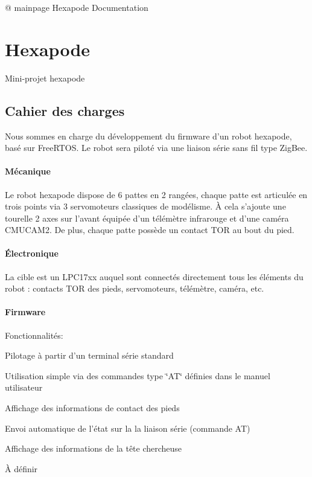 @ mainpage Hexapode Documentation \section*{Hexapode }

Mini-\/projet hexapode

\subsection*{Cahier des charges}

Nous sommes en charge du développement du firmware d'un robot hexapode, basé sur Free\-R\-T\-O\-S. Le robot sera piloté via une liaison série sans fil type Zig\-Bee.

\paragraph*{Mécanique}

Le robot hexapode dispose de 6 pattes en 2 rangées, chaque patte est articulée en trois points via 3 servomoteurs classiques de modélisme. À cela s'ajoute une tourelle 2 axes sur l'avant équipée d'un télémètre infrarouge et d'une caméra C\-M\-U\-C\-A\-M2. De plus, chaque patte possède un contact T\-O\-R au bout du pied.

\paragraph*{Électronique}

La cible est un L\-P\-C17xx auquel sont connectés directement tous les éléments du robot \-: contacts T\-O\-R des pieds, servomoteurs, télémètre, caméra, etc.

\paragraph*{Firmware}

Fonctionnalités\-:


\begin{DoxyItemize}
\item Pilotage à partir d'un terminal série standard
\begin{DoxyItemize}
\item Utilisation simple via des commandes type \char`\"{}\-A\-T\char`\"{} définies dans le manuel utilisateur
\end{DoxyItemize}
\item Affichage des informations de contact des pieds
\begin{DoxyItemize}
\item Envoi automatique de l'état sur la la liaison série (commande A\-T)
\end{DoxyItemize}
\item Affichage des informations de la tête chercheuse
\begin{DoxyItemize}
\item À définir
\end{DoxyItemize}
\end{DoxyItemize}

